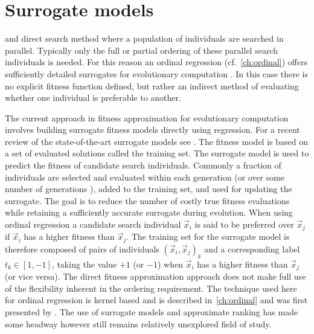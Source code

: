 

\chapter{Surrogate models}\label{ch:surrogates} 

 and direct search method where a population of individuals are searched in parallel.  Typically only the full or partial ordering of these parallel search individuals is needed.  For this reason an ordinal regression (cf.~\cref{ch:ordinal}) offers sufficiently detailed surrogates for evolutionary computation \citep{Ru06:PPSN}.  In this case there is no explicit fitness function defined, but rather an indirect method of evaluating whether one individual is preferable to another.

The current approach in fitness approximation for evolutionary computation involves building surrogate fitness models directly using regression.  For a recent review of the state-of-the-art surrogate models see \citep{Ong04,Sobester05,Jin05,Lim07}. The fitness model is based on a set of evaluated solutions called the training set. The surrogate model is used to predict the fitness of candidate search individuals. Commonly a fraction of individuals are selected and evaluated within each generation (or over some number of generations \citep{Jin02}), added to the training set, and used for updating the surrogate.  The goal is to reduce the number of costly true fitness evaluations while retaining a sufficiently accurate surrogate during evolution. When using ordinal regression a candidate search individual $\vec{x}_i$ is said to be preferred over $\vec{x}_j$ if $\vec{x}_i$ has a higher fitness than $\vec{x}_j$. The training set for the surrogate model is therefore composed of pairs of individuals $(\vec{x}_i,\vec{x}_j)_k$ and a corresponding label $t_k\in[1,-1]$, taking the value $+1$ (or $-1$) when $\vec{x}_i$ has a higher fitness than $\vec{x}_j$ (or vice versa).  The direct fitness approximation approach does not make full use of the flexibility inherent in the ordering requirement. The technique used here for ordinal regression is kernel based and is described in~\cref{ch:ordinal} and was first presented by \citet{Ru06:PPSN}. The use of surrogate models and approximate  ranking has made some headway  \citep[cf.][]{Loshchilov10} however still remains relatively unexplored field of study.

